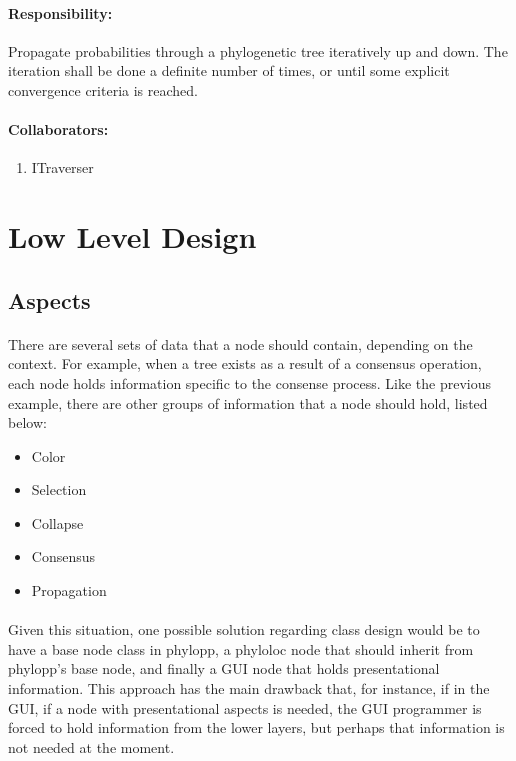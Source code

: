 \documentclass[a4paper,10pt]{article}
\begin{document}
    \paragraph{Responsibility:} Propagate probabilities through a phylogenetic tree iteratively up and down. The iteration shall be done a definite number of times, or until some explicit convergence criteria is reached.
    \paragraph{Collaborators:}
      \begin{enumerate}
       \item ITraverser
      \end{enumerate}

\section{Low Level Design}
\label{lld}  

\subsection{Aspects}

\paragraph{}
There are several sets of data that a node should contain, depending on the context. For example, when a tree exists as a result of a consensus operation, each node holds information specific to the consense process.
Like the previous example, there are other groups of information that a node should hold, listed below:

\begin{itemize}

	\item{Color}
	\item{Selection}
	\item{Collapse}
	\item{Consensus}
	\item{Propagation}

\end{itemize}

\paragraph{}
Given this situation, one possible solution regarding class design would be to have a base node class in phylopp, a phyloloc node that should inherit from phylopp's base node, and finally a GUI node that holds presentational information. This approach has the main drawback that, for instance, if in the GUI, if a node with presentational aspects is needed, the GUI programmer is forced to hold information from the lower layers, but perhaps that information is not needed at the moment.
\end{document}
